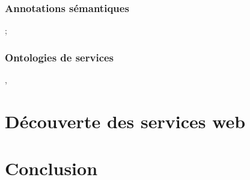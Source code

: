 	\subsubsection{Annotations sémantiques};
	\subsubsection{Ontologies de services} 
	  \cite{mcguinness2004owl} , \cite{mcilraith2003bringing}

\section{Découverte des services web}


\section{Conclusion}

